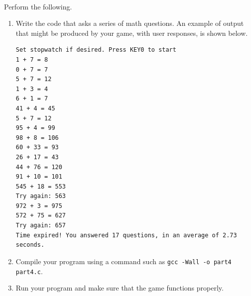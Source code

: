 \documentclass[epsfig,10pt,fullpage]{article}
\newcommand{\CommonDocsPath}{../../common/docs}
\begin{document}
~\\
\noindent Perform the following.

\begin{enumerate}
\item Write the code that asks a series of math questions. An example of output that might
be produced by your game, with user responses, is shown below.

\begin{lstlisting}
Set stopwatch if desired. Press KEY0 to start
1 + 7 = 8
0 + 7 = 7
5 + 7 = 12
1 + 3 = 4
6 + 1 = 7
41 + 4 = 45
5 + 7 = 12
95 + 4 = 99
98 + 8 = 106
60 + 33 = 93
26 + 17 = 43
44 + 76 = 120
91 + 10 = 101
545 + 18 = 553
Try again: 563
972 + 3 = 975
572 + 75 = 627
Try again: 657
Time expired! You answered 17 questions, in an average of 2.73 seconds.
\end{lstlisting}

\item Compile your program using a command such as \texttt{gcc -Wall -o part4 part4.c}.
\item Run your program and make sure that the game functions properly.
\end{enumerate}

\vskip 0.5in
\noindent
\newpage

\end{document}
